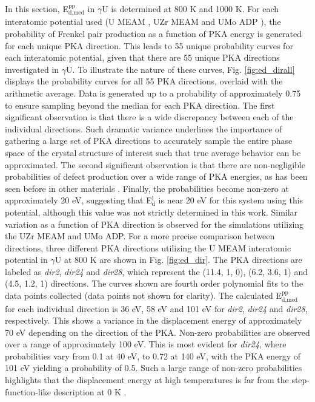 \documentclass[review]{elsarticle}
\begin{document}
In this section, E$^{\textrm{pp}}_{\textrm{d,med}}$ in $\gamma$U is determined at 800 K and 1000 K. For each interatomic potential used (U MEAM \cite{beeler_meam}, UZr MEAM \cite{moore2015} and UMo ADP \cite{smirnovaADP}), the probability of Frenkel pair production as a function of PKA energy is generated for each unique PKA direction. This leads to 55 unique probability curves for each interatomic potential, given that there are 55 unique PKA directions investigated in $\gamma$U. To illustrate the nature of these curves, Fig. \ref{fig:ed_dirall} displays the probability curves for all 55 PKA directions, overlaid with the arithmetic average. Data is generated up to a probability of approximately 0.75 to ensure sampling beyond the median for each PKA direction. The first significant observation is that there is a wide discrepancy between each of the individual directions. Such dramatic variance underlines the importance of gathering a large set of PKA directions to accurately sample the entire phase space of the crystal structure of interest such that true average behavior can be approximated. The second significant observation is that there are non-negligible probabilities of defect production over a wide range of PKA energies, as has been seen before in other materials \cite{beeler2016, nordlund2006, zepeda-ruiz2003, tsuchihira2013}. Finally, the probabilities become non-zero at approximately 20 eV, suggesting that E$^{\textrm{l}}_{\textrm{d}}$ is near 20 eV for this system using this potential, although this value was not strictly determined in this work. Similar variation as a function of PKA direction is observed for the simulations utilizing the UZr MEAM and UMo ADP. For a more precise comparison between directions, three different PKA directions utilizing the U MEAM interatomic potential in $\gamma$U at 800 K are shown in Fig. \ref{fig:ed_dir}. The PKA directions are labeled as \textit{dir2}, \textit{dir24} and \textit{dir28}, which represent the (11.4, 1, 0), (6.2, 3.6, 1) and (4.5, 1.2, 1) directions. The curves shown are fourth order polynomial fits to the data points collected (data points not shown for clarity). The calculated E$^{\textrm{pp}}_{\textrm{d,med}}$ for each individual direction is 36 eV, 58 eV and 101 eV for \textit{dir2}, \textit{dir24} and \textit{dir28}, respectively. This shows a variance in the displacement energy of approximately 70 eV depending on the direction of the PKA. Non-zero probabilities are observed over a range of approximately 100 eV. This is most evident for \textit{dir24}, where probabilities vary from 0.1 at 40 eV, to 0.72 at 140 eV, with the PKA energy of 101 eV yielding a probability of 0.5. Such a large range of non-zero probabilities highlights that the displacement energy at high temperatures is far from the step-function-like description at 0 K \cite{was2007}.
 
\end{document}
